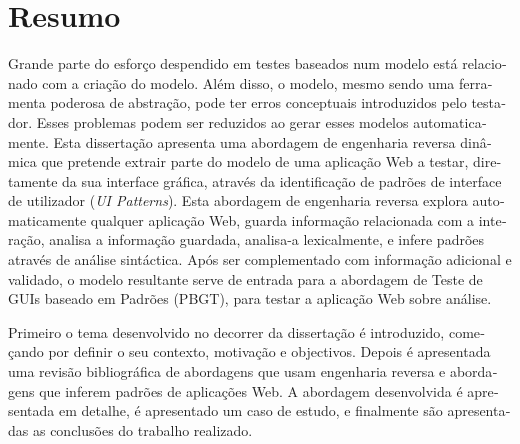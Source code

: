 \chapter*{Resumo}
\begin{otherlanguage}{portuguese}
Grande parte do esforço despendido em testes baseados num modelo está relacionado com a criação do modelo. Além disso, o modelo, mesmo sendo uma ferramenta poderosa de abstração, pode ter erros conceptuais introduzidos pelo testador. Esses problemas podem ser reduzidos ao gerar esses modelos automaticamente. Esta dissertação apresenta uma abordagem de engenharia reversa dinâmica que pretende extrair parte do modelo de uma aplicação Web a testar, diretamente da sua interface gráfica, através da identificação de padrões de interface de utilizador (\textit{UI Patterns}). Esta abordagem de engenharia reversa explora automaticamente qualquer aplicação Web, guarda informação relacionada com a interação, analisa a informação guardada, analisa-a lexicalmente, e infere padrões através de análise sintáctica. Após ser complementado com informação adicional e validado, o modelo resultante serve de entrada para a abordagem de Teste de GUIs baseado em Padrões (PBGT), para testar a aplicação Web sobre análise.

Primeiro o tema desenvolvido no decorrer da dissertação é introduzido, começando por definir o seu contexto, motivação e objectivos. Depois é apresentada uma revisão bibliográfica de abordagens que usam engenharia reversa e abordagens que inferem padrões de aplicações Web.  A abordagem desenvolvida é apresentada em detalhe, é apresentado um caso de estudo, e finalmente são apresentadas as conclusões do trabalho realizado.
\end{otherlanguage}
